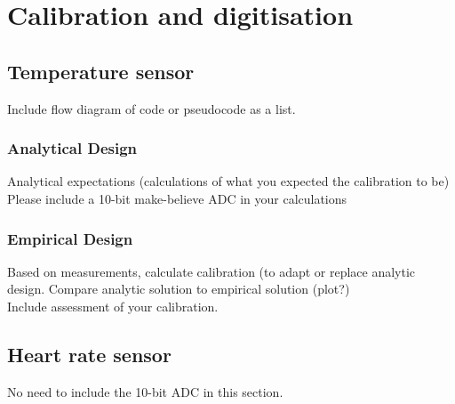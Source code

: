 \chapter{Calibration and digitisation}\label{ch:ADC}

\section{Temperature sensor} \label{sec:ADCTemp}
Include flow diagram of code or pseudocode as a list.
\subsection{Analytical Design} \label{sec:ADCTempAna}
Analytical expectations (calculations of what you expected the calibration to be)
Please include a 10-bit make-believe ADC in your calculations
\subsection{Empirical Design} \label{sec:ADCTempEmp}
Based on measurements, calculate calibration (to adapt or replace analytic design. 
Compare analytic solution to empirical solution (plot?)\\
Include assessment of your calibration. 


\section{Heart rate sensor} \label{sec:ADCHeart}
No need to include the 10-bit ADC in this section. 



